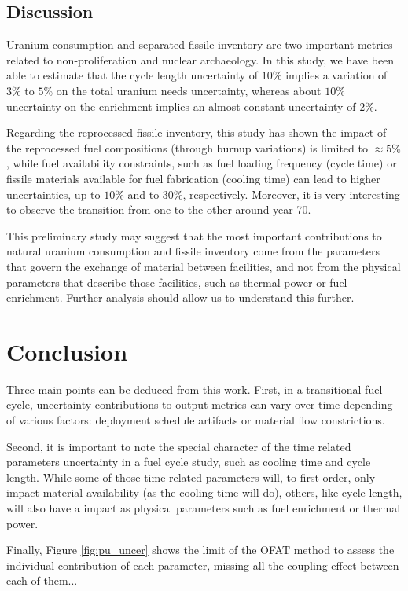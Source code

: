 \documentclass{anstrans}
\begin{document}
\subsection{Discussion}

Uranium consumption and separated fissile inventory are two important metrics
related to non-proliferation and nuclear archaeology.  In this study, we have
been able to estimate that the cycle length uncertainty of $10\%$ implies a
variation of $3\%$ to $5\%$ on the total uranium needs uncertainty, whereas
about $10\%$ uncertainty on the enrichment implies an almost constant
uncertainty of $2\%$.

Regarding the reprocessed fissile inventory, this study has shown the impact of
the reprocessed fuel compositions (through burnup variations) is limited to
$\approx5\%$, while fuel availability constraints, such as fuel loading
frequency (cycle time) or fissile materials available for fuel fabrication
(cooling time) can lead to higher uncertainties, up to $10\%$ and to $30\%$,
respectively.  Moreover, it is very interesting to observe the transition from
one to the other around year 70.

This preliminary study may suggest that the most important contributions to
natural uranium consumption and fissile inventory come from the parameters that
govern the exchange of material between facilities, and not from the physical
parameters that describe those facilities, such as thermal power or fuel
enrichment. Further analysis should allow us to understand this further.


\section{Conclusion}

Three main points can be deduced from this work.  First, in a transitional fuel
cycle, uncertainty contributions to output metrics can vary over time depending
of various factors: deployment schedule artifacts or material flow
constrictions.

Second, it is important to note the special character of the time related
parameters uncertainty in a fuel cycle study, such as cooling time and cycle
length.  While some of those time related parameters will, to first order, only
impact material availability (as the cooling time will do), others, like cycle
length, will also have a impact as physical parameters such as fuel enrichment
or thermal power.  

Finally, Figure \ref{fig:pu_uncer} shows the limit of the \gls{OFAT} method to
assess the individual contribution of each parameter, missing all the coupling
effect between each of them... 
\end{document}
